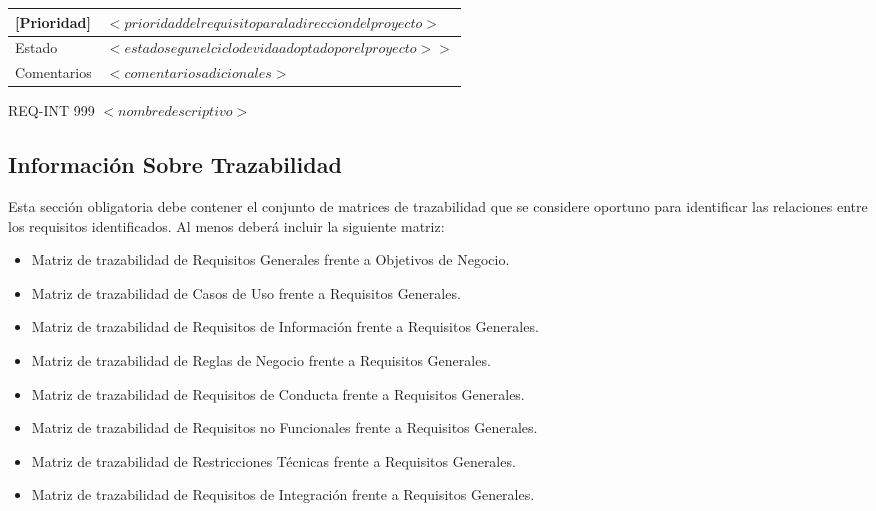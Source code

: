 \begin{Artefacto}[H]
\begin{tabular}{|p{3cm}|p{10cm}|}
         \hline
         \cellcolor{gray30}  [Prioridad] &  	$<prioridad del requisito para la direccion del proyecto>$\\
         \hline
         \cellcolor{gray30}  Estado	&$<estado  segun el ciclo de vida adoptado por el proyecto>>$\\   
        \hline       
         \cellcolor{gray30}  Comentarios	& $<comentarios adicionales>$ \\   
        \hline
  
    \end{tabular}
\caption{REQ-INT 999	$<nombre descriptivo>$ }
  \end{Artefacto}




\subsection{Información Sobre Trazabilidad}

\begin{textoazul}
Esta sección obligatoria debe contener el conjunto de matrices de trazabilidad que se considere oportuno para identificar las relaciones entre los requisitos identificados. Al menos deberá incluir la siguiente matriz:
\begin{itemize}
\item Matriz de trazabilidad de Requisitos Generales frente a Objetivos de Negocio.
\item Matriz de trazabilidad de Casos de Uso frente a Requisitos Generales.
\item Matriz de trazabilidad de Requisitos de Información frente a Requisitos Generales.
\item Matriz de trazabilidad de Reglas de Negocio frente  a Requisitos Generales.
\item Matriz de trazabilidad de Requisitos de Conducta frente a Requisitos Generales.
\item Matriz de trazabilidad de Requisitos no Funcionales frente a Requisitos Generales.
\item Matriz de trazabilidad de Restricciones Técnicas frente a Requisitos Generales.
\item Matriz de trazabilidad de Requisitos de Integración frente a Requisitos Generales.

\end{itemize}
\end{textoazul}
 

